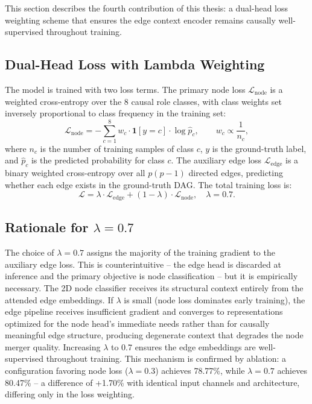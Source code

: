 This section describes the fourth contribution of this thesis: a dual-head loss weighting scheme that ensures the edge context encoder remains causally well-supervised throughout training.

\subsection{Dual-Head Loss with Lambda Weighting}

The model is trained with two loss terms. The primary node loss $\mathcal{L}_{\mathrm{node}}$ is a weighted cross-entropy over the 8 causal role classes, with class weights set inversely proportional to class frequency in the training set:
\begin{equation}
\mathcal{L}_{\mathrm{node}} = -\sum_{c=1}^{8} w_c \cdot \mathbf{1}[y = c] \cdot \log \hat{p}_c, \qquad w_c \propto \frac{1}{n_c},
\label{eq:node_loss}
\end{equation}
where $n_c$ is the number of training samples of class $c$, $y$ is the ground-truth label, and $\hat{p}_c$ is the predicted probability for class $c$. The auxiliary edge loss $\mathcal{L}_{\mathrm{edge}}$ is a binary weighted cross-entropy over all $p(p-1)$ directed edges, predicting whether each edge exists in the ground-truth DAG. The total training loss is:
\begin{equation}
\mathcal{L} = \lambda \cdot \mathcal{L}_{\mathrm{edge}} + (1 - \lambda) \cdot \mathcal{L}_{\mathrm{node}}, \quad \lambda = 0.7.
\label{eq:total_loss}
\end{equation}

\subsection{Rationale for $\lambda = 0.7$}

The choice of $\lambda = 0.7$ assigns the majority of the training gradient to the auxiliary edge loss. This is counterintuitive -- the edge head is discarded at inference and the primary objective is node classification -- but it is empirically necessary. The 2D node classifier receives its structural context entirely from the attended edge embeddings. If $\lambda$ is small (node loss dominates early training), the edge pipeline receives insufficient gradient and converges to representations optimized for the node head's immediate needs rather than for causally meaningful edge structure, producing degenerate context that degrades the node merger quality. Increasing $\lambda$ to 0.7 ensures the edge embeddings are well-supervised throughout training. This mechanism is confirmed by ablation: a configuration favoring node loss ($\lambda = 0.3$) achieves 78.77\%, while $\lambda = 0.7$ achieves 80.47\% -- a difference of +1.70\% with identical input channels and architecture, differing only in the loss weighting.

